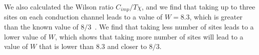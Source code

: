 \documentclass[reprint,onecolumn,prb,superscriptaddress]{revtex4-2}
\begin{document}
We also calculated the Wilson ratio $C_{imp}/T\chi$, and we find that taking up to three sites on each conduction channel leads to a value of $ W = 8.3$, which is greater than the known value of \(8/3\)~\cite{affleck_1991_overscreen,affleck_ludwig_1991,affleck_pang_cox_1992,affleck1993exact,
parcollet_olivier_large_N,affleck_2005,emery_kivelson,clarke_giamarchi_1993,zarand_2000,
vondelft_prl_1998,schofield_1997,bullaNRGreview,affleck_pang_cox_1992,pang_cox_1991,
andrei_destri_1984,Tsvelick1984,Tsvelick_1985,andrei_jerez_1995,zarand_costi_2002,
sengupta_1994,fabrizio_nozieres_1995,Coleman_tsvelik,fabrizio_gogolin_1995}. We find that taking less number of sites leads to a lower value of \(W\), which shows that taking more number of sites will lead to a value of \(W\) that is lower than \(8.3\) and closer to \(8/3\). 
\end{document}
